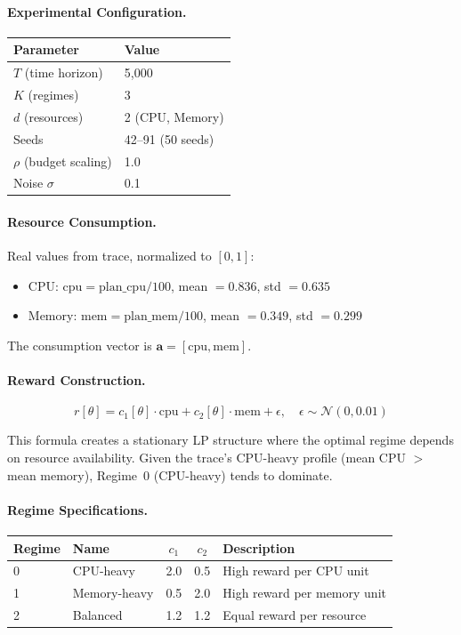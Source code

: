 \documentclass[11pt]{article}
\newcommand{\ba}{\mathbf{a}}
\begin{document}
\paragraph{Experimental Configuration.}

\begin{center}
\begin{tabular}{ll}
\toprule
Parameter & Value \\
\midrule
$T$ (time horizon) & 5,000 \\
$K$ (regimes) & 3 \\
$d$ (resources) & 2 (CPU, Memory) \\
Seeds & 42--91 (50 seeds) \\
$\rho$ (budget scaling) & 1.0 \\
Noise $\sigma$ & 0.1 \\
\bottomrule
\end{tabular}
\end{center}

\paragraph{Resource Consumption.}
Real values from trace, normalized to $[0,1]$:
\begin{itemize}
    \item CPU: $\mathrm{cpu} = \mathrm{plan\_cpu}/100$, mean $= 0.836$, std $= 0.635$
    \item Memory: $\mathrm{mem} = \mathrm{plan\_mem}/100$, mean $= 0.349$, std $= 0.299$
\end{itemize}
The consumption vector is $\ba = [\mathrm{cpu}, \mathrm{mem}]$.

\paragraph{Reward Construction.}
\[
r[\theta] = c_1[\theta] \cdot \mathrm{cpu} + c_2[\theta] \cdot \mathrm{mem} + \epsilon, \quad \epsilon \sim \mathcal{N}(0, 0.01)
\]

This formula creates a stationary LP structure where the optimal regime depends on resource availability. Given the trace's CPU-heavy profile (mean CPU $>$ mean memory), Regime~0 (CPU-heavy) tends to dominate.

\paragraph{Regime Specifications.}

\begin{center}
\begin{tabular}{llccl}
\toprule
Regime & Name & $c_1$ & $c_2$ & Description \\
\midrule
0 & CPU-heavy & 2.0 & 0.5 & High reward per CPU unit \\
1 & Memory-heavy & 0.5 & 2.0 & High reward per memory unit \\
2 & Balanced & 1.2 & 1.2 & Equal reward per resource \\
\bottomrule
\end{tabular}
\end{center}
\end{document}

